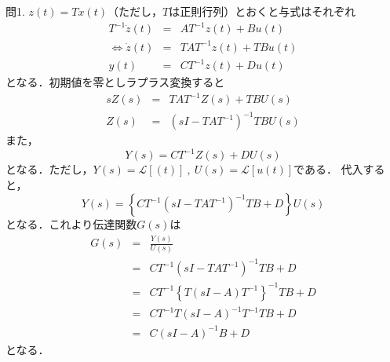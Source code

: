 \documentclass[a4paper,12pt]{jarticle}
\begin{document}
\section*{}
問1.
$z(t)=Tx(t)$（ただし，$T$は正則行列）とおくと与式はそれぞれ
\begin{eqnarray}
 T^{-1}\dot{z}(t)&=&AT^{-1} z(t)+Bu(t) \nonumber\\
 \iff \dot{z}(t)&=&TAT^{-1}z(t)+TBu(t)\\
 y(t)&=&CT^{-1}z(t)+Du(t)
\end{eqnarray}
となる．初期値を零としラプラス変換すると
\begin{eqnarray}
 sZ(s)&=&TAT^{-1}Z(s)+TBU(s) \nonumber\\
 Z(s)&=&(sI-TAT^{-1})^{-1}TBU(s)
\end{eqnarray}
また，
\begin{equation}
 Y(s)=CT^{-1}Z(s)+DU(s)
\end{equation}
となる．ただし，$Y(s)=\mathcal{L}[(t)]~,~U(s)=\mathcal{L}[u(t)]$である．
代入すると，
%
\begin{equation}
 Y(s)=\left\{CT^{-1}(sI-TAT^{-1})^{-1}TB+D\right\}U(s)
\end{equation}
%
となる．これより伝達関数$G(s)$は
%
\begin{eqnarray}
 G(s)&=&\frac{Y(s)}{U(s)} \nonumber\\
 &=&CT^{-1}(sI-TAT^{-1})^{-1}TB+D \nonumber\\
 &=&CT^{-1}\left\{T(sI-A)T^{-1}\right\}^{-1}TB+D \nonumber\\
 &=&CT^{-1}T(sI-A)^{-1}T^{-1}TB+D \nonumber\\
 &=&C(sI-A)^{-1}B+D
\end{eqnarray}
%
となる．
\end{document}
